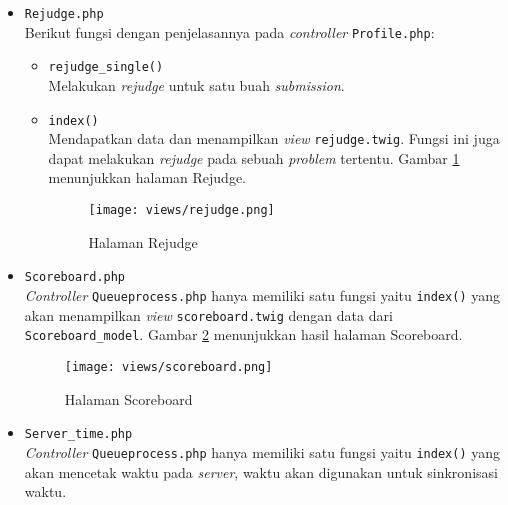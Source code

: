 \begin{itemize}
      \item \verb|Rejudge.php| \\
            Berikut fungsi dengan penjelasannya pada \textit{controller} \verb|Profile.php|:

            \begin{itemize}
                  \item \verb|rejudge_single()| \\
                        Melakukan \textit{rejudge} untuk satu buah \textit{submission}.
                  \item \verb|index()| \\
                        Mendapatkan data dan menampilkan \textit{view} \verb|rejudge.twig|. Fungsi ini juga dapat melakukan \textit{rejudge} pada sebuah \textit{problem} tertentu. Gambar \ref{fig:3:1:1:rejudge} menunjukkan halaman Rejudge.

                        \begin{figure}[H]
                              \centering
                              \texttt{[image: views/rejudge.png]}
                              \caption{Halaman Rejudge}
                              \label{fig:3:1:1:rejudge}
                        \end{figure}

            \end{itemize}

      \item \verb|Scoreboard.php| \\
            \textit{Controller} \verb|Queueprocess.php| hanya memiliki satu fungsi yaitu \verb|index()| yang akan menampilkan \textit{view} \verb|scoreboard.twig| dengan data dari \verb|Scoreboard_model|. Gambar \ref{fig:3:1:1:scoreboard} menunjukkan hasil halaman Scoreboard.

            \begin{figure}[H]
                  \centering
                  \texttt{[image: views/scoreboard.png]}
                  \caption{Halaman Scoreboard}
                  \label{fig:3:1:1:scoreboard}
            \end{figure}

      \item \verb|Server_time.php| \\
            \textit{Controller} \verb|Queueprocess.php| hanya memiliki satu fungsi yaitu \verb|index()| yang akan mencetak waktu pada \textit{server}, waktu akan digunakan untuk sinkronisasi waktu.


\end{itemize}
